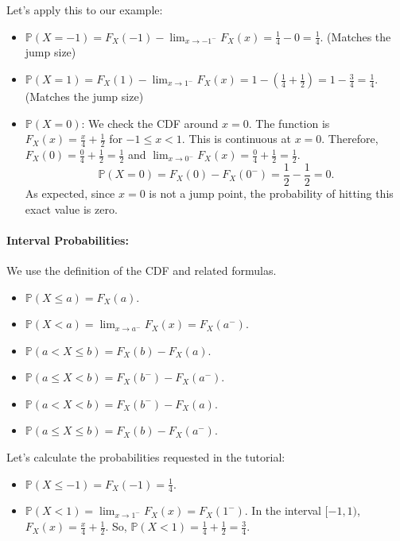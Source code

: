 \documentclass[11pt]{article}
\theoremstyle{mytheoremstyle}
\theoremstyle{mydefinitionstyle}
\newcommand{\Prob}{\mathbb{P}} %
\begin{document}
Let's apply this to our example:
\begin{itemize}
    \item $\Prob(X=-1) = F_X(-1) - \lim_{x \to -1^-} F_X(x) = \frac{1}{4} - 0 = \frac{1}{4}$. (Matches the jump size)
    \item $\Prob(X=1) = F_X(1) - \lim_{x \to 1^-} F_X(x) = 1 - \left(\frac{1}{4} + \frac{1}{2}\right) = 1 - \frac{3}{4} = \frac{1}{4}$. (Matches the jump size)
    \item $\Prob(X=0)$: We check the CDF around $x=0$. The function is $F_X(x) = \frac{x}{4} + \frac{1}{2}$ for $-1 \le x < 1$. This is continuous at $x=0$. Therefore, $F_X(0) = \frac{0}{4} + \frac{1}{2} = \frac{1}{2}$ and $\lim_{x \to 0^-} F_X(x) = \frac{0}{4} + \frac{1}{2} = \frac{1}{2}$.
    \[ \Prob(X=0) = F_X(0) - F_X(0^-) = \frac{1}{2} - \frac{1}{2} = 0. \]
    As expected, since $x=0$ is not a jump point, the probability of hitting this exact value is zero.
\end{itemize}

\paragraph{Interval Probabilities:}
We use the definition of the CDF and related formulas.
\begin{itemize}
    \item $\Prob(X \le a) = F_X(a)$.
    \item $\Prob(X < a) = \lim_{x \to a^-} F_X(x) = F_X(a^-)$.
    \item $\Prob(a < X \le b) = F_X(b) - F_X(a)$.
    \item $\Prob(a \le X < b) = F_X(b^-) - F_X(a^-)$.
    \item $\Prob(a < X < b) = F_X(b^-) - F_X(a)$.
    \item $\Prob(a \le X \le b) = F_X(b) - F_X(a^-)$.
\end{itemize}

Let's calculate the probabilities requested in the tutorial:
\begin{itemize}
    \item $\Prob(X \le -1) = F_X(-1) = \frac{1}{4}$.
    \item $\Prob(X < 1) = \lim_{x \to 1^-} F_X(x) = F_X(1^-)$. In the interval $[-1, 1)$, $F_X(x) = \frac{x}{4} + \frac{1}{2}$.
    So, $\Prob(X < 1) = \frac{1}{4} + \frac{1}{2} = \frac{3}{4}$.
\end{itemize}
\end{document}
